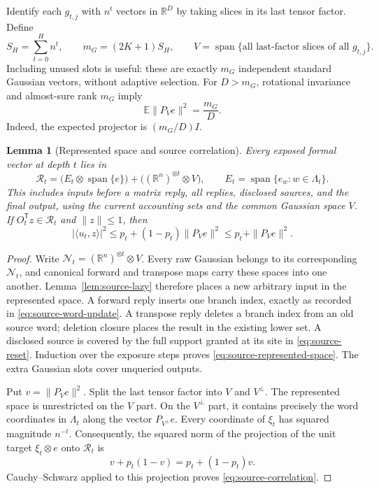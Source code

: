 \documentclass[11pt,letterpaper]{article}
\newtheorem{lemma}[theorem]{Lemma}
\theoremstyle{definition}
\theoremstyle{remark}
\begin{document}
Identify each $g_{t,j}$ with $n^t$ vectors in $\mathbb R^D$ by
taking slices in its last tensor factor.  Define
\begin{equation}
  S_H=\sum_{t=0}^H n^t,\qquad
  m_G=(2K+1)S_H,\qquad
  V=\operatorname{span}\{\text{all last-factor slices of all }g_{t,j}\}.
  \label{eq:source-gaussian-space}
\end{equation}
Including unused slots is useful: these are exactly $m_G$
independent standard Gaussian vectors, without adaptive selection.
For $D>m_G$, rotational invariance and almost-sure rank $m_G$ imply
\begin{equation}
  \mathbb E\|P_Ve\|^2=\frac{m_G}{D}.
  \label{eq:source-gaussian-projection}
\end{equation}
Indeed, the expected projector is $(m_G/D)I$.

\begin{lemma}[Represented space and source correlation]
\label{lem:source-correlation}
Every exposed formal vector at depth $t$ lies in
\begin{equation}
  \mathcal R_t=
  \bigl(E_t\otimes\operatorname{span}\{e\}\bigr)
  +\bigl((\mathbb R^n)^{\otimes t}\otimes V\bigr),
  \qquad E_t=\operatorname{span}\{e_w:w\in\Lambda_t\}.
  \label{eq:source-represented-space}
\end{equation}
This includes inputs before a matrix reply, all replies, disclosed
sources, and the final output, using the current accounting sets and
the common Gaussian space $V$.  If $O_t^{\mathsf T}z\in\mathcal R_t$
and $\|z\|\leq1$, then
\begin{equation}
  |\langle u_t,z\rangle|^2
  \leq p_t+(1-p_t)\|P_Ve\|^2
  \leq p_t+\|P_Ve\|^2.
  \label{eq:source-correlation}
\end{equation}
\end{lemma}

\begin{proof}
Write $\mathcal N_t=(\mathbb R^n)^{\otimes t}\otimes V$.
Every raw Gaussian belongs to its corresponding $\mathcal N_t$,
and canonical forward and transpose maps carry these spaces into
one another.  Lemma~\ref{lem:source-lazy} therefore places a new
arbitrary input in the represented space.  A forward reply inserts
one branch index, exactly as recorded in
\eqref{eq:source-word-update}.  A transpose reply deletes a branch
index from an old source word; deletion closure places the result
in the existing lower set.  A disclosed source is covered by the
full support granted at its site in \eqref{eq:source-reset}.
Induction over the exposure steps proves
\eqref{eq:source-represented-space}.  The extra Gaussian slots cover
unqueried outputs.

Put $v=\|P_Ve\|^2$.  Split the last tensor factor into $V$ and
$V^\perp$.  The represented space is unrestricted on the $V$
part.  On the $V^\perp$ part, it contains precisely the word
coordinates in $\Lambda_t$ along the vector $P_{V^\perp}e$.
Every coordinate of $\xi_t$ has squared magnitude $n^{-t}$.
Consequently, the squared norm of the projection of the unit target
$\xi_t\otimes e$ onto $\mathcal R_t$ is
\[
  v+p_t(1-v)=p_t+(1-p_t)v.
\]
Cauchy--Schwarz applied to this projection proves
\eqref{eq:source-correlation}.
\end{proof}
\end{document}
